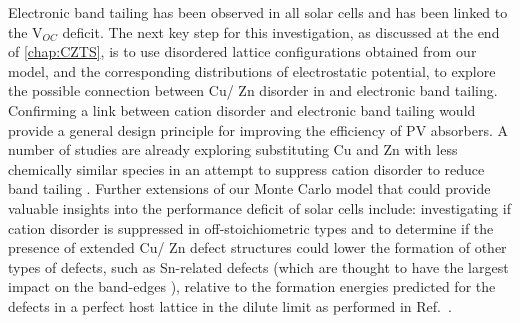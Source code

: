 \documentclass[11pt, twoside]{report}
\begin{document}
Electronic band tailing has been observed in all {\CZTS} solar cells and has been linked to the V$_{OC}$ deficit.
The next key step for this investigation, as discussed at the end of \autoref{chap:CZTS}, is to use disordered lattice configurations obtained from our model, and the corresponding distributions of electrostatic potential, to explore the possible connection between Cu/ Zn disorder in {\CZTS} and electronic band tailing. Confirming a link between cation disorder and electronic band tailing would provide a general design principle for improving the efficiency of PV absorbers. A number of studies are already exploring substituting Cu and Zn with less chemically similar species in an attempt to suppress cation disorder to reduce band tailing \cite{Gerschon_AZTSe, distant_cations, Tong_Ba-CZTS}. Further extensions of our Monte Carlo model that could provide valuable insights into the performance deficit of {\CZTS} solar cells include: investigating if cation disorder is suppressed in off-stoichiometric {\CZTS} types \cite{CZTS_types} and to determine if the presence of extended Cu/ Zn defect structures could lower the formation of other types of defects, such as Sn-related defects (which are thought to have the largest impact on the band-edges \cite{kesterite_band_tails}), relative to the formation energies predicted for the defects in a perfect host lattice in the dilute limit as performed in Ref.~.


\end{document}

